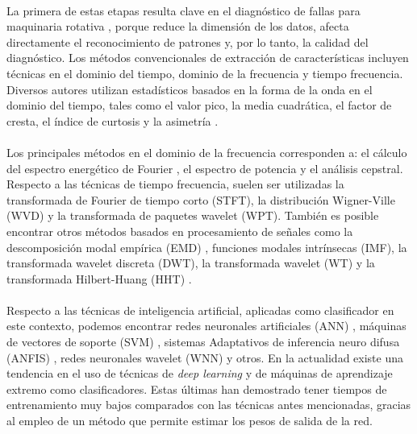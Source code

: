 \documentclass[a4paper,12pt]{article}
\begin{document}
\paragraph{}
La primera de estas etapas resulta clave en el diagnóstico de fallas para maquinaria rotativa \cite{guo}, porque reduce la dimensión de los datos, afecta directamente el reconocimiento de patrones y, por lo tanto, la calidad del diagnóstico. Los métodos convencionales de extracción de características incluyen técnicas en el dominio del tiempo, dominio de la frecuencia y tiempo frecuencia. Diversos autores utilizan estadísticos basados en la forma de la onda en el dominio del tiempo, tales como el valor pico, la media cuadrática, el factor de cresta, el índice de curtosis y la asimetría \cite{zhu}.
 
\paragraph{}
Los principales métodos en el dominio de la frecuencia corresponden a: el cálculo del espectro energético de Fourier \cite{jia}, el espectro de potencia \cite{li} y el análisis cepstral. Respecto a las  técnicas de tiempo frecuencia, suelen ser utilizadas la transformada de Fourier de tiempo corto (STFT), la distribución Wigner-Ville (WVD) y la transformada de paquetes wavelet (WPT). También es posible encontrar otros métodos basados en procesamiento de señales como la descomposición modal empírica (EMD) \cite{yu}, funciones modales intrínsecas (IMF), la transformada wavelet discreta (DWT), la transformada wavelet (WT) \cite{chang} y la transformada Hilbert-Huang (HHT) \cite{rai}.

\paragraph{}
Respecto a las técnicas de inteligencia artificial, aplicadas como clasificador en este contexto, podemos encontrar redes neuronales artificiales (ANN) \cite{ali}, máquinas de vectores de soporte (SVM) \cite{konar}, sistemas Adaptativos de inferencia neuro difusa (ANFIS) \cite{issam}, redes neuronales wavelet (WNN) \cite{wu} y otros. En la actualidad existe una tendencia en el uso de técnicas de \textit{deep learning} y de máquinas de aprendizaje extremo \cite{nibaldo,mao} como clasificadores. Estas últimas han demostrado tener tiempos de entrenamiento muy bajos comparados con las técnicas antes mencionadas, gracias al empleo de un método que permite estimar los pesos de salida de la red.
\end{document}
